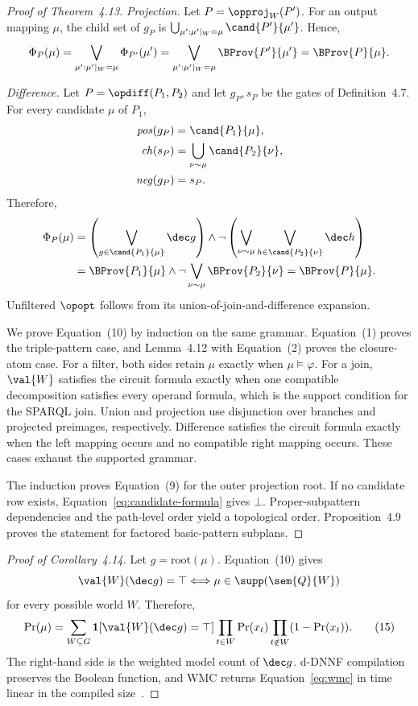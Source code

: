 \documentclass[sigconf, nonacm]{acmart}
\begin{document}
\begin{proof}[Proof of Theorem~4.13]
\emph{Projection.} Let $P=\opproj_W(P')$. For an output mapping $\mu$, the child set of $g_P$ is $\bigcup_{\mu':\mu'|_W=\mu}\cand{P'}{\mu'}$. Hence,
\[
 \Phi_P(\mu)
 =\bigvee_{\mu':\mu'|_W=\mu}\Phi_{P'}(\mu')
 =\bigvee_{\mu':\mu'|_W=\mu}\BProv{P'}{\mu'}
 =\BProv{P}{\mu}.
\]

\emph{Difference.} Let $P=\opdiff(P_1,P_2)$ and let $g_P,s_P$ be the gates of Definition~4.7. For every candidate $\mu$ of $P_1$,
\begin{align*}
 \mathit{pos}(g_P)&=\cand{P_1}{\mu},\\
 \mathit{ch}(s_P)&=\bigcup_{\nu\sim\mu}\cand{P_2}{\nu},\\
 \mathit{neg}(g_P)&=s_P.
\end{align*}
Therefore,
\begin{align*}
 \Phi_P(\mu)
 &=\left(\bigvee_{g\in\cand{P_1}{\mu}}\dec g\right)
 \land\neg\left(\bigvee_{\nu\sim\mu}\bigvee_{h\in\cand{P_2}{\nu}}\dec h\right)\\
 &=\BProv{P_1}{\mu}\land
 \neg\bigvee_{\nu\sim\mu}\BProv{P_2}{\nu}
 =\BProv{P}{\mu}.
\end{align*}
Unfiltered $\opopt$ follows from its union-of-join-and-difference expansion.

We prove Equation~(10) by induction on the same grammar. Equation~(1) proves the triple-pattern case, and Lemma~4.12 with Equation~(2) proves the closure-atom case. For a filter, both sides retain $\mu$ exactly when $\mu\models\varphi$. For a join, $\val{W}$ satisfies the circuit formula exactly when one compatible decomposition satisfies every operand formula, which is the support condition for the SPARQL join. Union and projection use disjunction over branches and projected preimages, respectively. Difference satisfies the circuit formula exactly when the left mapping occurs and no compatible right mapping occurs. These cases exhaust the supported grammar.

The induction proves Equation~(9) for the outer projection root. If no candidate row exists, Equation~\eqref{eq:candidate-formula} gives $\bot$. Proper-subpattern dependencies and the path-level order yield a topological order. Proposition~4.9 proves the statement for factored basic-pattern subplans.
\end{proof}

\begin{proof}[Proof of Corollary~4.14]
Let $g=\mathrm{root}(\mu)$. Equation~(10) gives
\[
 \val{W}(\dec g)=\top
 \Longleftrightarrow
 \mu\in\supp(\sem{Q}{W})
\]
for every possible world $W$. Therefore,
\[
 \Pr(\mu)=
 \sum_{W\subseteq G}
 \mathbf 1[\val{W}(\dec g)=\top]
 \prod_{t\in W}\Pr(x_t)
 \prod_{t\notin W}(1-\Pr(x_t)).
 \tag{15}\label{eq:wmc}
\]
The right-hand side is the weighted model count of $\dec g$. d-DNNF compilation preserves the Boolean function, and WMC returns Equation~\eqref{eq:wmc} in time linear in the compiled size~\cite{darwiche2002kcmap}.
\end{proof}
\end{document}
